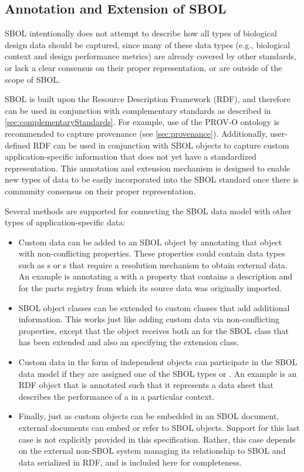 
\subsection{Annotation and Extension of SBOL}
\label{sec:Annotations}

SBOL intentionally does not attempt to describe how all types of biological design data should be captured, since many of these data types (e.g., biological context and design performance metrics) are already covered by other standards, or lack a clear consensus on their proper representation, or are outside of the scope of SBOL.

SBOL is built upon the Resource Description Framework (RDF), and therefore can be used in conjunction with complementary standards as described in \ref{sec:complementaryStandards}.  For example, use of the PROV-O ontology is recommended to capture provenance (see \ref{sec:provenance}).  
Additionally, user-defined RDF can be used in conjunction with SBOL objects to capture custom application-specific information that does not yet have a standardized representation.  
This annotation and extension mechanism is designed to enable new types of data to be easily incorporated into the SBOL standard once there is community consensus on their proper representation.

Several methods are supported for connecting the SBOL data model with other types of application-specific data:

\begin{itemize}
\item Custom data can be added to an SBOL object by annotating that object with non-conflicting properties. These properties could contain  data types such as s or s that require a resolution mechanism to obtain external data. An example is annotating a  with  a property that contains a  description and  for the parts registry from which its source data was originally imported.
\item SBOL object classes can be extended to custom classes that add additional information. This works just like adding custom data via non-conflicting properties, except that the object receives both an  for the SBOL class that has been extended and also an  specifying the extension class.
\item Custom data in the form of independent objects can participate in the SBOL data model if they are assigned one of the SBOL types  or .  An example is an RDF object that is annotated such that it represents a data sheet that describes the performance of a  in a particular context.
\item Finally, just as custom objects can be embedded in an  SBOL document, external documents can embed or refer to SBOL objects. Support for this last case is not explicitly provided in this specification. Rather, this case depends on the external non-SBOL system managing its relationship to SBOL and data serialized in RDF, and is included here for completeness.
\end{itemize}

